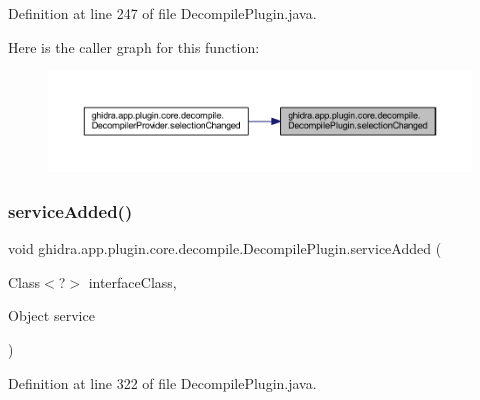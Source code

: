 Definition at line 247 of file Decompile\+Plugin.\+java.

Here is the caller graph for this function\+:
\nopagebreak
\begin{figure}[H]
\begin{center}
\leavevmode
\includegraphics[width=350pt]{classghidra_1_1app_1_1plugin_1_1core_1_1decompile_1_1_decompile_plugin_a9c2782ea5bd9d52ed1e1c67e1eb63c75_icgraph}
\end{center}
\end{figure}
\mbox{\label{classghidra_1_1app_1_1plugin_1_1core_1_1decompile_1_1_decompile_plugin_aed00c4c6a2838059ff1ba5cf77ddf187}} 
\subsubsection{\texorpdfstring{serviceAdded()}{serviceAdded()}}
{\footnotesize\ttfamily void ghidra.\+app.\+plugin.\+core.\+decompile.\+Decompile\+Plugin.\+service\+Added (\begin{DoxyParamCaption}\item[{Class$<$?$>$}]{interface\+Class,  }\item[{Object}]{service }\end{DoxyParamCaption})\hspace{0.3cm}{\ttfamily [inline]}}



Definition at line 322 of file Decompile\+Plugin.\+java.

